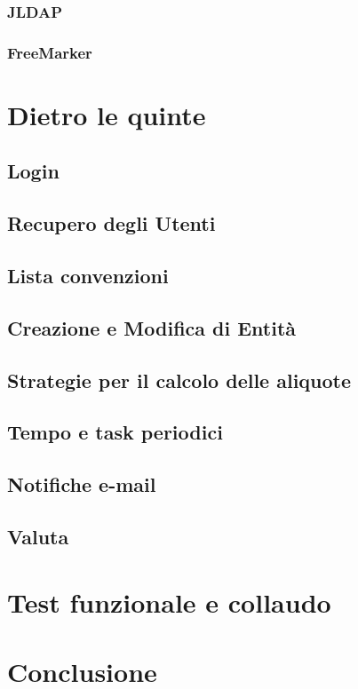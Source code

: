 \documentclass[italian,laurea,oneside,10pt]{UFtesi}
\begin{document}
\subsection{JLDAP}
\label{jldap}

\subsection{FreeMarker}
\label{freemarker}



\chapter{Dietro le quinte}
\label{code}

\section{Login}
\label{login}

\section{Recupero degli Utenti}

\section{Lista convenzioni}


\section{Creazione e Modifica di Entità}


\section{Strategie per il calcolo delle aliquote}

\section{Tempo e task periodici}

\section{Notifiche e-mail}

\section{Valuta}



\chapter{Test funzionale e collaudo}
\label{howto}


\chapter{Conclusione}


\nocite{*}		 %
{}

\end{document}
